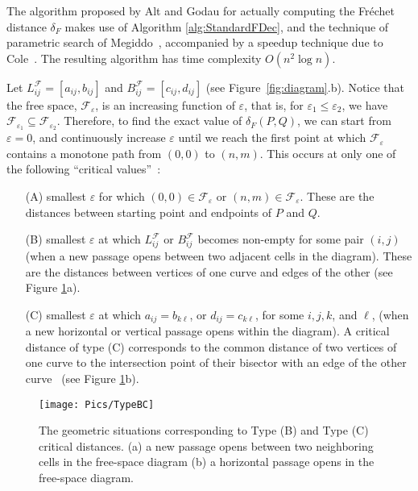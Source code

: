 \documentclass[12pt]{dalthesis}
\newcommand{\lee}{\leqslant}
\newcommand{\eps}{\varepsilon}
\newcommand{\CF}{{\mathscr F}}
\newcommand{\Frechet}{Fr\'echet }
\newcommand{\distF}{\delta_F}
\newcommand{\Feps}{\CF_\eps}
\newcommand{\LF}{L^\CF}
\newcommand{\BF}{B^\CF}
\begin{document}
The algorithm proposed by Alt and Godau for actually computing the \Frechet distance $\distF$ 
makes use of Algorithm \ref{alg:StandardFDec}, and the technique of parametric search of Megiddo~\cite{Megiddo83}, 
accompanied by a speedup technique due to Cole~\cite{Cole87}. 
The resulting algorithm has time complexity $O(n^2 \log n)$.

Let $\LF_{ij} = [a_{ij}, b_{ij}]$ and  $\BF_{ij} = [c_{ij}, d_{ij}]$ (see Figure~\ref{fig:diagram}.b). 
Notice that the free space, $\Feps$, is an increasing function of $\eps$, 
that is, for $\eps_1 \lee \eps_2$, we have $\CF_{\eps_1} \subseteq \CF_{\eps_2}$.
Therefore, to find the exact value of $\distF(P,Q)$,
we can start from $\eps = 0$, and continuously increase $\eps$ until
we reach the first point at which $\Feps$ contains a monotone path from $(0,0)$ to $(n,m)$.
This occurs at only one of the following ``critical values''~\cite{AltG95}:
\begin{itemize} \itemsep1pt
	\item[(A)] smallest $\eps$ for which $(0,0) \in \Feps$ or $(n,m) \in \Feps$. 
	These are the distances between starting point and endpoints of $P$ and $Q$.
	
	
	\item[(B)] smallest $\eps$ at which $\LF_{ij}$ or $\BF_{ij}$  becomes non-empty for some
 	pair $(i,j)$ (when a new passage opens between two adjacent cells in the diagram). 
	These are the distances between vertices of one curve and edges of the other (see Figure \ref{fig:TypeBC}a).
	
	\item[(C)] smallest $\eps$ at which $a_{ij} =b_{k\ell}$, or 
	$d_{ij} = c_{k\ell}$, for some $i,j,k$, and $\ell$, 
	(when a new horizontal or vertical passage opens within the diagram). 
	A critical distance of type (C) corresponds to the common 
	distance of two vertices of one curve 
	to the intersection point of their bisector 
	with an edge of the other curve~\cite{AltG95} (see Figure \ref{fig:TypeBC}b).
\end{itemize}



\begin{figure}[t]
	\centering
	\texttt{[image: Pics/TypeBC]}
	\caption{The geometric situations corresponding to Type (B) and Type (C)
 critical distances. 
(a) a new passage opens between two neighboring cells in the free-space diagram (b) a horizontal passage opens in the free-space diagram. }
	\label{fig:TypeBC}
\end{figure}
\end{document}
